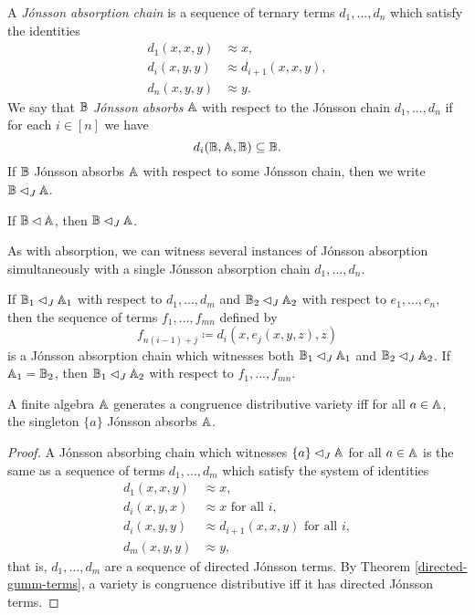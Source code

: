 \documentclass[letterpaper,11pt]{article}
\begin{document}
\begin{defn} A \emph{J\'onsson absorption chain} is a sequence of ternary terms $d_1, ..., d_n$ which satisfy the identities
\begin{align*}
d_1(x,x,y) &\approx x,\\
d_i(x,y,y) &\approx d_{i+1}(x,x,y),\\
d_n(x,y,y) &\approx y.
\end{align*}
We say that $\mathbb{B}$ \emph{J\'onsson absorbs} $\mathbb{A}$ with respect to the J\'onsson chain $d_1, ..., d_n$ if for each $i \in [n]$ we have
\[
d_i(\mathbb{B},\mathbb{A},\mathbb{B}) \subseteq \mathbb{B}.
\]
If $\mathbb{B}$ J\'onsson absorbs $\mathbb{A}$ with respect to some J\'onsson chain, then we write $\mathbb{B} \lhd_J \mathbb{A}$.
\end{defn}

\begin{prop} If $\mathbb{B} \lhd \mathbb{A}$, then $\mathbb{B} \lhd_J \mathbb{A}$.
\end{prop}

As with absorption, we can witness several instances of J\'onsson absorption simultaneously with a single J\'onsson absorption chain $d_1, ..., d_n$.

\begin{prop}\label{simultaneous-jonsson-absorption} If $\mathbb{B}_1 \lhd_J \mathbb{A}_1$ with respect to $d_1, ..., d_m$ and $\mathbb{B}_2 \lhd_J \mathbb{A}_2$ with respect to $e_1, ..., e_n$, then the sequence of terms $f_1, ..., f_{mn}$ defined by
\[
f_{n(i-1)+j} \coloneqq d_i(x,e_j(x,y,z),z)
\]
is a J\'onsson absorption chain which witnesses both $\mathbb{B}_1 \lhd_J \mathbb{A}_1$ and $\mathbb{B}_2 \lhd_J \mathbb{A}_2$. If $\mathbb{A}_1 = \mathbb{B}_2$, then $\mathbb{B}_1 \lhd_J \mathbb{A}_2$ with respect to $f_1, ..., f_{mn}$.
\end{prop}

\begin{cor} A finite algebra $\mathbb{A}$ generates a congruence distributive variety iff for all $a \in \mathbb{A}$, the singleton $\{a\}$ J\'onsson absorbs $\mathbb{A}$.
\end{cor}
\begin{proof} A J\'onsson absorbing chain which witnesses $\{a\} \lhd_J \mathbb{A}$ for all $a \in \mathbb{A}$ is the same as a sequence of terms $d_1, ..., d_m$ which satisfy the system of identities
\begin{align*}
d_1(x,x,y) &\approx x,\\
d_i(x,y,x) &\approx x\text{ for all }i,\\
d_i(x,y,y) &\approx d_{i+1}(x,x,y)\text{ for all }i,\\
d_m(x,y,y) &\approx y,
\end{align*}
that is, $d_1, ..., d_m$ are a sequence of directed J\'onsson terms. By Theorem \ref{directed-gumm-terms}, a variety is congruence distributive iff it has directed J\'onsson terms.
\end{proof}
\end{document}
